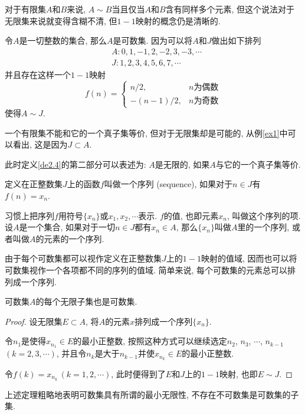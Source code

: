 \documentclass[cn,12pt,math=mtpro2,citestyle=gb7714-2015,bibstyle=gb7714-2015,twocol]{elegantbook}
\begin{document}
对于有限集$A$和$B$来说, $A\sim B$当且仅当$A$和$B$含有同样多个元素, 但这个说法对于无限集来说就变得含糊不清, 但$1-1$映射的概念仍是清晰的.

\begin{example}\label{ex1}
令$A$是一切整数的集合, 那么$A$是可数集. 因为可以将$A$和$J$做出如下排列
\begin{align*}
&A: 0, 1, -1, 2, -2, 3, -3, \cdots \\
&J: 1, 2, 3, 4, 5, 6, 7, \cdots
\end{align*}
并且存在这样一个$1-1$映射
$$f(n)=\begin{cases}
         n/2, & n\text{为偶数} \\
         -(n-1)/2, & n\text{为奇数}
       \end{cases}$$
使得$A\sim J$.
\end{example}
\begin{remark}
一个有限集不能和它的一个真子集等价, 但对于无限集却是可能的, 从例\ref{ex1}中可以看出, 这是因为$J\subset A$.

此时定义\ref{de2.4}的第二部分可以表述为: $A$是无限的, 如果$A$与它的一个真子集等价.
\end{remark}
\begin{definition}
定义在正整数集$J$上的函数$f$叫做一个序列 (sequence), 如果对于$n\in J$有$f(n)=x_n$.
\end{definition}
习惯上把序列$f$用符号$\{x_n\}$或$x_1, x_2, \cdots$表示. $f$的值, 也即元素$x_n$, 叫做这个序列的项. 设$A$是一个集合, 如果对于一切$n \in J$都有$x_n\in A$, 那么$\{x_n\}$叫做$A$里的一个序列, 或者叫做$A$的元素的一个序列.

由于每个可数集都可以视作定义在正整数集$J$上的$1-1$映射的值域, 因而也可以将可数集视作一个各项都不同的序列的值域. 简单来说, 每个可数集的元素总可以排列成一个序列.

\begin{theorem}{}\label{thm:th2.1}
  可数集$A$的每个无限子集也是可数集.
\end{theorem}
\begin{proof}
  设无限集$E\subset A$, 将$A$的元素$x$排列成一个序列$\{x_n\}$.

  令$n_1$是使得$x_{n_1}\in E$的最小正整数, 按照这种方式可以继续选定$n_2$, $n_3$, $\cdots$, $n_{k-1}$ $(k=2,3,\cdots)$, 并且令$n_k$是大于$n_{k-1}$并使$x_ {n_k}\in E$的最小正整数.

  令$f(k)=x_{n_k}\,(k=1,2,\cdots)$, 此时便得到了$E$和$J$上的$1-1$映射, 也即$E\sim J$.


\end{proof}
上述定理粗略地表明可数集具有所谓的最小无限性, 不存在不可数集是可数集的子集.
\end{document}
